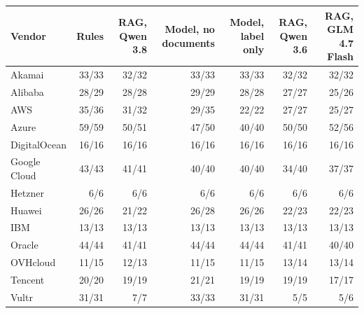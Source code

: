 \begin{tabular}{lrrrrrr}
\toprule
Vendor & Rules & RAG, Qwen 3.8 & Model, no documents & Model, label only & RAG, Qwen 3.6 & RAG, GLM 4.7 Flash \\
\midrule
Akamai & 33/33 & 32/32 & 33/33 & 33/33 & 32/32 & 32/32 \\
Alibaba & 28/29 & 28/28 & 29/29 & 28/28 & 27/27 & 25/26 \\
AWS & 35/36 & 31/32 & 29/35 & 22/22 & 27/27 & 25/27 \\
Azure & 59/59 & 50/51 & 47/50 & 40/40 & 50/50 & 52/56 \\
DigitalOcean & 16/16 & 16/16 & 16/16 & 16/16 & 16/16 & 16/16 \\
Google Cloud & 43/43 & 41/41 & 40/40 & 40/40 & 34/40 & 37/37 \\
Hetzner & 6/6 & 6/6 & 6/6 & 6/6 & 6/6 & 6/6 \\
Huawei & 26/26 & 21/22 & 26/28 & 26/26 & 22/23 & 22/23 \\
IBM & 13/13 & 13/13 & 13/13 & 13/13 & 13/13 & 13/13 \\
Oracle & 44/44 & 41/41 & 44/44 & 44/44 & 41/41 & 40/40 \\
OVHcloud & 11/15 & 12/13 & 11/15 & 11/15 & 13/14 & 13/14 \\
Tencent & 20/20 & 19/19 & 21/21 & 19/19 & 19/19 & 17/17 \\
Vultr & 31/31 & 7/7 & 33/33 & 31/31 & 5/5 & 5/6 \\
\bottomrule
\end{tabular}
